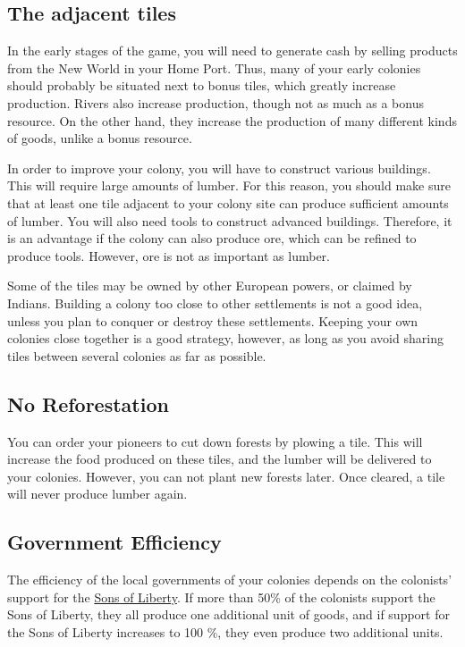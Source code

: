 \documentclass[12pt]{book}
\begin{document}
\hypertarget{The adjacent tiles}{\subsection{The adjacent tiles}}

In the early stages of the game, you will need to generate cash by
selling products from the New World in your Home Port. Thus, many of
your early colonies should probably be situated next to bonus tiles,
which greatly increase production. Rivers also increase production,
though not as much as a bonus resource. On the other hand, they
increase the production of many different kinds of goods, unlike a
bonus resource.

In order to improve your colony, you will have to construct various
buildings. This will require large amounts of lumber. For this reason,
you should make sure that at least one tile adjacent to your colony
site can produce sufficient amounts of lumber. You will also need
tools to construct advanced buildings. Therefore, it is an advantage
if the colony can also produce ore, which can be refined to produce
tools. However, ore is not as important as lumber.

Some of the tiles may be owned by other European powers, or claimed by
Indians. Building a colony too close to other settlements is not a
good idea, unless you plan to conquer or destroy these settlements.
Keeping your own colonies close together is a good strategy, however,
as long as you avoid sharing tiles between several colonies as far as
possible.


\hypertarget{No Reforestation}{\subsection{No Reforestation}}

You can order your pioneers to cut down forests by plowing a tile.
This will increase the food produced on these tiles, and the lumber
will be delivered to your colonies. However, you can not plant new
forests later. Once cleared, a tile will never produce lumber again.


\hypertarget{Government Efficiency}{\subsection{Government Efficiency}}

The efficiency of the local governments of your colonies depends on
the colonists' support for the \hyperlink{Sons of Liberty}{Sons of
  Liberty}. If more than 50\% of the colonists support the Sons of
Liberty, they all produce one additional unit of goods, and if support
for the Sons of Liberty increases to 100 \%, they even produce two
additional units. 
\end{document}
